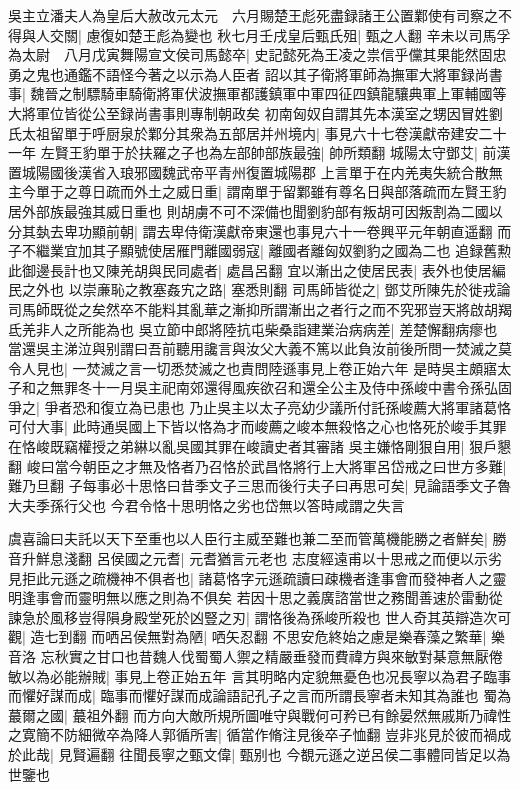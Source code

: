 吳主立潘夫人為皇后大赦改元太元　六月賜楚王彪死盡録諸王公置鄴使有司察之不得與人交關|{
	慮復如楚王彪為變也}
秋七月壬戌皇后甄氏殂|{
	甄之人翻}
辛未以司馬孚為太尉　八月戊寅舞陽宣文侯司馬懿卒|{
	史記懿死為王凌之祟信乎儻其果能然固忠勇之鬼也通鑑不語怪今著之以示為人臣者}
詔以其子衛將軍師為撫軍大將軍録尚書事|{
	魏晉之制驃騎車騎衛將軍伏波撫軍都護鎮軍中軍四征四鎮龍驤典軍上軍輔國等大將軍位皆從公至録尚書事則專制朝政矣}
初南匈奴自謂其先本漢室之甥因冒姓劉氏太祖留單于呼厨泉於鄴分其衆為五部居并州境内|{
	事見六十七卷漢獻帝建安二十一年}
左賢王豹單于於扶羅之子也為左部帥部族最強|{
	帥所類翻}
城陽太守鄧艾|{
	前漢置城陽國後漢省入琅邪國魏武帝平青州復置城陽郡}
上言單于在内羌夷失統合散無主今單于之尊日疏而外土之威日重|{
	謂南單于留鄴雖有尊名日與部落疏而左賢王豹居外部族最強其威日重也}
則胡虜不可不深備也聞劉豹部有叛胡可因叛割為二國以分其埶去卑功顯前朝|{
	謂去卑侍衛漢獻帝東還也事見六十一卷興平元年朝直遥翻}
而子不繼業宜加其子顯號使居雁門離國弱寇|{
	離國者離匈奴劉豹之國為二也}
追録舊勲此御邊長計也又陳羌胡與民同處者|{
	處昌呂翻}
宜以漸出之使居民表|{
	表外也使居編民之外也}
以崇亷恥之教塞姦宄之路|{
	塞悉則翻}
司馬師皆從之|{
	鄧艾所陳先於徙戎論司馬師既從之矣然卒不能料其亂華之漸抑所謂漸出之者行之而不究邪豈天將啟胡羯氐羌非人之所能為也}
吳立節中郎將陸抗屯柴桑詣建業治病病差|{
	差楚懈翻病瘳也}
當還吳主涕泣與别謂曰吾前聽用讒言與汝父大義不篤以此負汝前後所問一焚滅之莫令人見也|{
	一焚滅之言一切悉焚滅之也責問陸遜事見上卷正始六年}
是時吳主頗寤太子和之無罪冬十一月吳主祀南郊還得風疾欲召和還全公主及侍中孫峻中書令孫弘固爭之|{
	爭者恐和復立為已患也}
乃止吳主以太子亮幼少議所付託孫峻薦大將軍諸葛恪可付大事|{
	此時通吳國上下皆以恪為才而峻薦之峻本無殺恪之心也恪死於峻手其罪在恪峻既竊權授之弟綝以亂吳國其罪在峻讀史者其審諸}
吳主嫌恪剛狠自用|{
	狠戶懇翻}
峻曰當今朝臣之才無及恪者乃召恪於武昌恪將行上大將軍呂岱戒之曰世方多難|{
	難乃旦翻}
子每事必十思恪曰昔季文子三思而後行夫子曰再思可矣|{
	見論語季文子魯大夫季孫行父也}
今君令恪十思明恪之劣也岱無以答時咸謂之失言

虞喜論曰夫託以天下至重也以人臣行主威至難也兼二至而管萬機能勝之者鮮矣|{
	勝音升鮮息淺翻}
呂侯國之元耆|{
	元耆猶言元老也}
志度經遠甫以十思戒之而便以示劣見拒此元遜之疏機神不俱者也|{
	諸葛恪字元遜疏讀曰疎機者逢事會而發神者人之靈明逢事會而靈明無以應之則為不俱矣}
若因十思之義廣諮當世之務聞善速於雷動從諫急於風移豈得隕身殿堂死於凶豎之刃|{
	謂恪後為孫峻所殺也}
世人奇其英辯造次可觀|{
	造七到翻}
而哂呂侯無對為陋|{
	哂矢忍翻}
不思安危終始之慮是樂春藻之繁華|{
	樂音洛}
忘秋實之甘口也昔魏人伐蜀蜀人禦之精嚴垂發而費禕方與來敏對棊意無厭倦敏以為必能辦賊|{
	事見上卷正始五年}
言其明略内定貌無憂色也况長寧以為君子臨事而懼好謀而成|{
	臨事而懼好謀而成論語記孔子之言而所謂長寧者未知其為誰也}
蜀為蕞爾之國|{
	蕞祖外翻}
而方向大敵所規所圖唯守與戰何可矜已有餘晏然無戚斯乃禕性之寛簡不防細微卒為降人郭循所害|{
	循當作脩注見後卒子恤翻}
豈非兆見於彼而禍成於此哉|{
	見賢遍翻}
往聞長寧之甄文偉|{
	甄别也}
今覩元遜之逆呂侯二事體同皆足以為世鑒也

